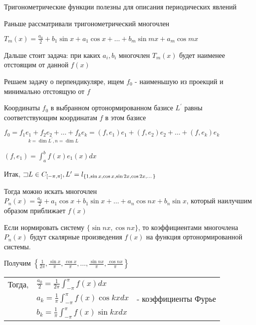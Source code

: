 \documentclass[12pt]{article}
\begin{document}
    Тригонометрические функции полезны для описания периодических явлений

    Раньше рассматривали тригонометрический многочлен

    $T_m(x) = \frac{a_0}{2} + b_1 \sin x + a_1 \cos x + \dots + b_m \sin mx + a_m \cos mx$

    Дальше стоит задача: при каких $a_i, b_i$ многочлен $T_m(x)$ будет наименее отстоящим от данной $f(x)$



    \Mem Решаем задачу о перпендикуляре, ищем $f_0$ - наименьшую из проекций и минимально отстоящую от $f$

    Координаты $f_0$ в выбранном ортонормированном базисе $L^\prime$ равны соответствующим координатам $f$ в этом базисе

    $f_0 = \underset{k = \dim L^\prime, n = \dim L}{f_1 e_1 + f_2 e_2 + \dots + f_k e_k} = 
    (f, e_1) e_1 + (f, e_2) e_2 + \dots + (f, e_k) e_k$

    $(f, e_1) = \int_a^b f(x) e_1(x) dx$

    \Nota Итак, $\mathord{\sqsupset} L \in C_{[-\pi, \pi]}, L^\prime = l_{\{1, \sin x, \cos x, \sin 2x, \cos 2x, \dots\}}$

    Тогда можно искать многочлен $P_n(x) = \frac{a_0}{2} + a_1 \cos x + b_1 \sin x + \dots + a_n \cos nx + b_n \sin x$, который
    наилучшим образом приближает $f(x)$

    Если нормировать систему $\{\sin nx, \cos nx\}$, то коэффициентами многочлена $P_n(x)$ будут скалярные произведения
    $f(x)$ на функция ортонормированной системы. 
    
    Получим $\left\{\frac{1}{2\pi}, \frac{\sin x}{\pi}, \frac{\cos x}{\pi}, \dots, \frac{\sin nx}{\pi}, \frac{\cos nx}{\pi}\right\}$

    {
        \begin{tabular}{l|l|l}
            \cline{2-2}
            Тогда, & $\frac{a_0}{2} = \frac{1}{2\pi} \int_{-\pi}^\pi f(x) dx$ & \\
            & $a_k = \frac{1}{\pi} \int_{-\pi}^\pi f(x) \cos kx dx$ & - коэффициенты Фурье \\
            & $b_k = \frac{1}{\pi} \int_{-\pi}^\pi f(x) \sin kx dx$ & \\
            \cline{2-2}
        \end{tabular}
    }
\end{document}
